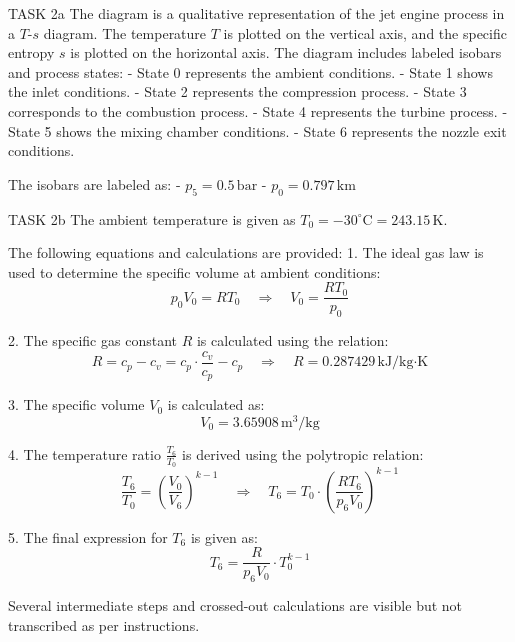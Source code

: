 TASK 2a  
The diagram is a qualitative representation of the jet engine process in a \( T \)-\( s \) diagram. The temperature \( T \) is plotted on the vertical axis, and the specific entropy \( s \) is plotted on the horizontal axis. The diagram includes labeled isobars and process states:  
- State 0 represents the ambient conditions.  
- State 1 shows the inlet conditions.  
- State 2 represents the compression process.  
- State 3 corresponds to the combustion process.  
- State 4 represents the turbine process.  
- State 5 shows the mixing chamber conditions.  
- State 6 represents the nozzle exit conditions.  

The isobars are labeled as:  
- \( p_5 = 0.5 \, \text{bar} \)  
- \( p_0 = 0.797 \, \text{km} \)  

TASK 2b  
The ambient temperature is given as \( T_0 = -30^\circ\text{C} = 243.15 \, \text{K} \).  

The following equations and calculations are provided:  
1. The ideal gas law is used to determine the specific volume at ambient conditions:  
   \[
   p_0 V_0 = R T_0 \quad \Rightarrow \quad V_0 = \frac{R T_0}{p_0}
   \]  

2. The specific gas constant \( R \) is calculated using the relation:  
   \[
   R = c_p - c_v = c_p \cdot \frac{c_v}{c_p} - c_p \quad \Rightarrow \quad R = 0.287429 \, \text{kJ/kg·K}
   \]  

3. The specific volume \( V_0 \) is calculated as:  
   \[
   V_0 = 3.65908 \, \text{m}^3/\text{kg}
   \]  

4. The temperature ratio \( \frac{T_6}{T_0} \) is derived using the polytropic relation:  
   \[
   \frac{T_6}{T_0} = \left( \frac{V_0}{V_6} \right)^{k-1} \quad \Rightarrow \quad T_6 = T_0 \cdot \left( \frac{R T_6}{p_6 V_0} \right)^{k-1}
   \]  

5. The final expression for \( T_6 \) is given as:  
   \[
   T_6 = \frac{R}{p_6 V_0} \cdot T_0^{k-1}
   \]  

Several intermediate steps and crossed-out calculations are visible but not transcribed as per instructions.